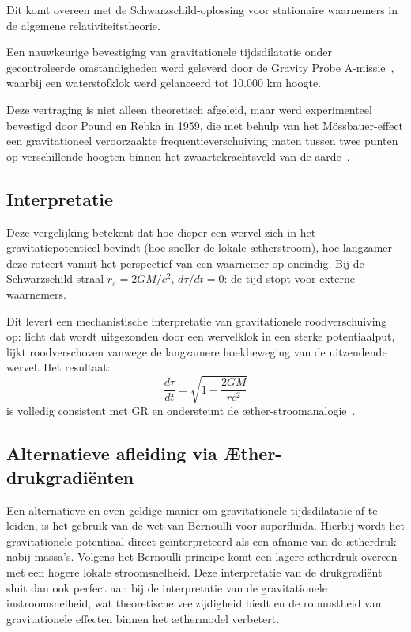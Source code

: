 Dit komt overeen met de Schwarzschild-oplossing voor stationaire waarnemers in de algemene relativiteitstheorie.

Een nauwkeurige bevestiging van gravitationele tijdsdilatatie onder gecontroleerde omstandigheden werd geleverd door de Gravity Probe A-missie~\cite{vessot_levine_1980}, waarbij een waterstofklok werd gelanceerd tot 10.000 km hoogte.

Deze vertraging is niet alleen theoretisch afgeleid, maar werd experimenteel bevestigd door Pound en Rebka in 1959, die met behulp van het Mössbauer-effect een gravitationeel veroorzaakte frequentieverschuiving maten tussen twee punten op verschillende hoogten binnen het zwaartekrachtsveld van de aarde~\cite{pound_rebka_1959}.


\subsection*{Interpretatie}

Deze vergelijking betekent dat hoe dieper een wervel zich in het gravitatiepotentieel bevindt (hoe sneller de lokale ætherstroom), hoe langzamer deze roteert vanuit het perspectief van een waarnemer op oneindig. Bij de Schwarzschild-straal $r_s = 2GM/c^2$, $d\tau/dt = 0$: de tijd stopt voor externe waarnemers.

Dit levert een mechanistische interpretatie van gravitationele roodverschuiving op: licht dat wordt uitgezonden door een wervelklok in een sterke potentiaalput, lijkt roodverschoven vanwege de langzamere hoekbeweging van de uitzendende wervel. Het resultaat:
\[
    \boxed{\frac{d\tau}{dt} = \sqrt{1 - \frac{2GM}{rc^2}}}
\]
is volledig consistent met GR en ondersteunt de æther-stroomanalogie~\cite{Schiller2022-maxforce}.

\subsection*{Alternatieve afleiding via Æther-drukgradiënten}

Een alternatieve en even geldige manier om gravitationele tijdsdilatatie af te leiden, is het gebruik van de wet van Bernoulli voor superfluïda. Hierbij wordt het gravitationele potentiaal direct geïnterpreteerd als een afname van de ætherdruk nabij massa's. Volgens het Bernoulli-principe komt een lagere ætherdruk overeen met een hogere lokale stroomsnelheid. Deze interpretatie van de drukgradiënt sluit dan ook perfect aan bij de interpretatie van de gravitationele instroomsnelheid, wat theoretische veelzijdigheid biedt en de robuustheid van gravitationele effecten binnen het æthermodel verbetert.